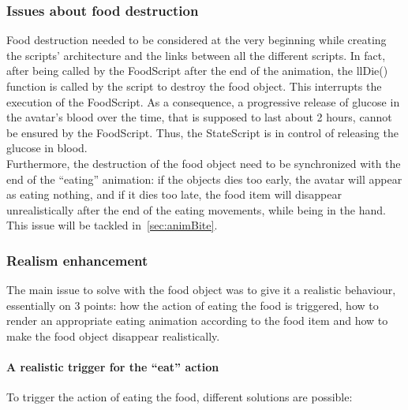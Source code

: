 \fi

    \subsubsection{Issues about food destruction}
\label{foodDestruction}
Food destruction needed to be considered at the very beginning while creating the scripts' architecture and the links between all the different scripts. In fact, after being called by the FoodScript after the end of the animation, the llDie()~\cite{LSLWebsite} function is called by the script to destroy the food object. This interrupts the execution of the FoodScript. As a consequence, a progressive release of glucose in the avatar's blood over the time, that is supposed to last about 2 hours, cannot be ensured by the FoodScript. Thus, the StateScript is in control of releasing the glucose in blood.\\

Furthermore, the destruction of the food object need to be synchronized with the end of the ``eating'' animation: if the objects dies too early, the avatar will appear as eating nothing, and if it dies too late, the food item will disappear unrealistically after the end of the eating movements, while being in the hand. This issue will be tackled in~\ref{sec:animBite}.




	\subsubsection{Realism enhancement}
The main issue to solve with the food object was to give it a realistic behaviour, essentially on 3 points: how the action of eating the food is triggered, how to render an appropriate eating animation according to the food item and how to make the food object disappear realistically.
\\
	\paragraph{A realistic trigger for the ``eat'' action}
\label{sec:food}

To trigger the action of eating the food, different solutions are possible: \\



